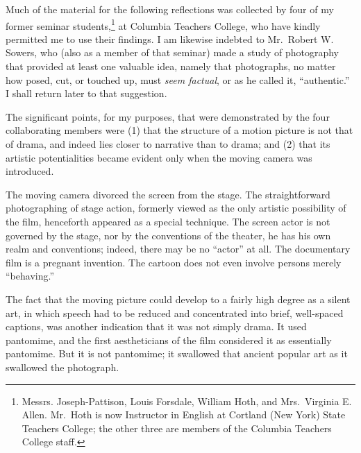 \documentclass{tufte-handout}
\begin{document}
\begin{titlepage}
Much of the material for the following reflections was collected by four
of my former seminar students,\footnote{Messrs. Joseph-Pattison, Louis
  Forsdale, William Hoth, and Mrs.~Virginia E. Allen. Mr.~Hoth is now
  Instructor in English at Cortland (New York) State Teachers College;
  the other three are members of the Columbia Teachers College staff.}
at Columbia Teachers College, who have kindly permitted me to use their
findings. I am likewise indebted to Mr.~Robert W. Sowers, who (also as a
member of that seminar) made a study of photography that provided at
least one valuable idea, namely that photographs, no matter how posed,
cut, or touched up, must \emph{seem factual}, or as he called it,
``authentic.'' I shall return later to that sug­gestion.

The significant points, for my purposes, that were demonstrated by the
four collaborating members were (1) that the structure of a motion
picture is not that of drama, and indeed lies closer to narrative than
to drama; and (2) that its artistic potentialities became evident only
when the moving camera was introduced.

The moving camera divorced the screen from the stage. The
straight­forward photographing of stage action, formerly viewed as the
only artistic possibility of the film, henceforth appeared as a special
technique. The screen actor is not governed by the stage, nor by the
conventions of the theater, he has his own realm and conventions;
indeed, there may be no ``actor'' at all. The documentary film is a
pregnant invention. The cartoon does not even involve persons merely
``behaving.''

\enlargethispage{2\baselineskip}

\vspace*{4em}



 \end{titlepage}


The fact that the moving picture could develop to a fairly high degree
as a silent art, in which speech had to be reduced and concen­trated into
brief, well-spaced captions, was another indication that it was not
simply drama. It used pantomime, and the first aestheticians of the film
considered it as essentially pantomime. But it is not pantomime; it
swallowed that ancient popular art as it swallowed the photograph.
\end{document}
